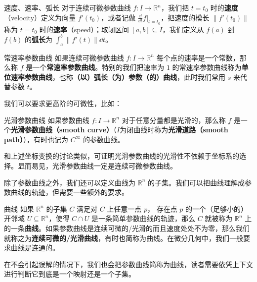 \begin{definition}{速度、速率、弧长}
对于连续可微参数曲线 $f: I \to \mathbb{R}^n$，我们把 $t = t_0$ 时的\textbf{速度}（velocity）定义为向量 $f'(t_0)$，或者记做 $\frac{\dd}{\dd t} f |_{t = t_0}$，把速度的模长 $\|f'(t_0)\|$ 称为 $t = t_0$ 时的\textbf{速率}（speed）；取闭区间 $[a, b] \subseteq I$，我们定义从 $f(a)$ 到 $f(b)$ 的\textbf{弧长}为 $\int_a^b \|f'(t)\| \dd t$。
\end{definition}

\begin{definition}{常速率参数曲线}\label{eucur_def1}
如果连续可微参数曲线 $f: I \to \mathbb{R}^n$ 每个点的速率是一个常数，那么称 $f$ 是一个\textbf{常速率参数曲线}。特别的我们把速率为 $1$ 的常速率参数曲线称为\textbf{单位速率参数曲线}，也称\textbf{（以）弧长（为）参数（的）曲线}，此时我们常用 $s$ 来代替参数 $t$。
\end{definition}

我们可以要求更高阶的可微性，比如：

\begin{definition}{光滑参数曲线}
如果参数曲线 $f: I \to \mathbb{R}^n$ 对于任意分量都是光滑的，那么称 $f$ 是一个\textbf{光滑参数曲线（smooth curve）}（$I$为闭曲线时称为\textbf{光滑道路（smooth path）}），有时也记为 $C^\infty$ 的参数曲线。
\end{definition}

和上述坐标变换的讨论类似，可证明光滑参数曲线的光滑性不依赖于坐标系的选择。显而易见，光滑参数曲线一定是连续可微参数曲线。

除了参数曲线之外，我们还可以定义曲线为 $\mathbb{R}^n$ 的子集。我们可以把曲线理解成参数曲线的轨迹，但需要一些额外的要求。

\begin{definition}{曲线}
如果 $\mathbb{R}^n$ 的子集 $C$ 满足对 $C$ 上任意一点 $p$， 存在点 $p$ 的一个（足够小的）开邻域 $U \subseteq \mathbb{R}^n$，使得 $C \cap U$ 是一条简单参数曲线的轨迹，那么 $C$ 就被称为 $\mathbb{R}^n$ 上的一条\textbf{曲线}。如果参数曲线是连续可微的/光滑的而且速度处处不为零，那么我们就称之为\textbf{连续可微的/光滑曲线}，有时也简称为曲线。在微分几何中，我们一般要求曲线是连通的。
\end{definition}

在不会引起误解的情况下，我们也会把参数曲线简称为曲线，读者需要依凭上下文进行判断它到底是一个映射还是一个子集。

